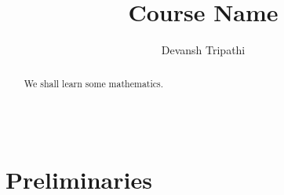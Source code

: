 \documentclass[12pt,reqno]{amsart}
\title{Course Name}
\author{Devansh Tripathi}
\theoremstyle{plain}
\theoremstyle{definition}
\begin{document}
\begin{abstract}
    We shall learn some mathematics.
\end{abstract}
\maketitle
{\large \part{\centering \\ Preliminaries}} %
\end{document}
